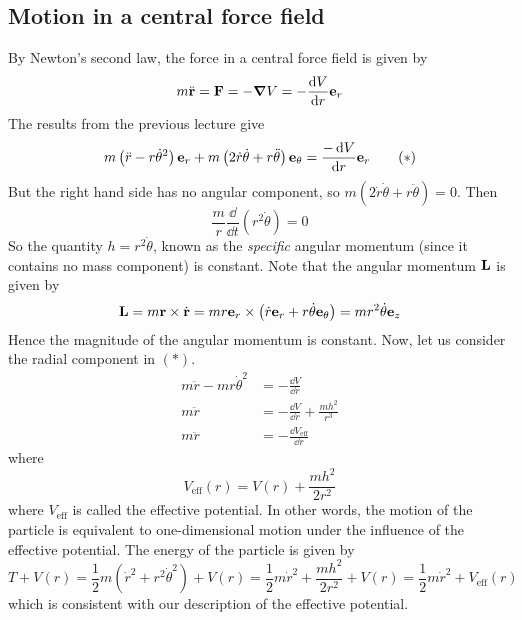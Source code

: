 \subsection{Motion in a central force field}
By Newton's second law, the force in a central force field is given by
\[
	m\ddot{\vb r} = \vb F = -\grad V = -\frac{\dd{V}}{\dd{r}} \vb e_r
\]
The results from the previous lecture give
\begin{equation}
	m\left(\ddot r - r\dot\theta^2\right) \vb e_r + m\left(2\dot r \dot \theta + r \ddot \theta\right) \vb e_\theta = \frac{-\dd{V}}{\dd{r}} \vb e_r \tag{\(\ast\)}
\end{equation}
But the right hand side has no angular component, so \(m\left(2\dot r \dot \theta + r \ddot \theta\right) = 0\).
Then
\[
	\frac{m}{r} \frac{\dd}{\dd{t}}\left(r^2 \dot\theta\right) = 0
\]
So the quantity \(h = r^2 \dot\theta\), known as the \textit{specific} angular momentum (since it contains no mass component) is constant.
Note that the angular momentum \(\vb L\) is given by
\[
	\vb L = m\vb r \times \dot{\vb r} = mr\vb e_r \times \left( \dot r\vb e_r + r\dot\theta \vb e_\theta \right) = mr^2 \dot\theta \vb e_z
\]
Hence the magnitude of the angular momentum is constant.
Now, let us consider the radial component in \((\ast)\).
\begin{align*}
	m\ddot r - mr\dot\theta^2 & = -\frac{\dd{V}}{\dd{r}}                    \\
	m\ddot r                  & = -\frac{\dd{V}}{\dd{r}} + \frac{mh^2}{r^3} \\
	m\ddot r                  & = -\frac{\dd{V}_\text{eff}}{\dd{r}}
\end{align*}
where
\[
	V_\text{eff}(r) = V(r) + \frac{mh^2}{2r^2}
\]
where \(V_\text{eff}\) is called the effective potential.
In other words, the motion of the particle is equivalent to one-dimensional motion under the influence of the effective potential.
The energy of the particle is given by
\[
	T + V(r) = \frac{1}{2}m\left( \dot r^2 + r^2 \dot\theta^2 \right) + V(r) = \frac{1}{2}m\dot r^2 + \frac{mh^2}{2r^2} + V(r) = \frac{1}{2}m\dot r^2 + V_\text{eff}(r)
\]
which is consistent with our description of the effective potential.

